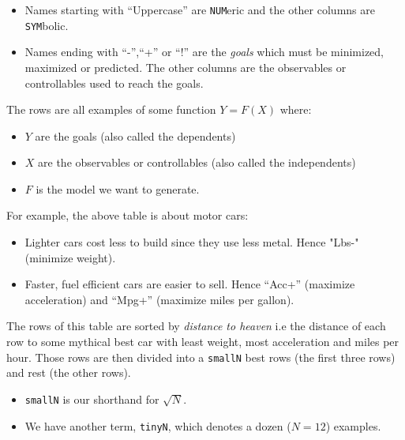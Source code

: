 \documentclass[landscape,	DIV=calc,%
							paper=letter,%
							fontsize=10pt,%
							twocolumn]{scrartcl}	 					%
\begin{document}
\begin{itemize}
    \item Names starting with ``Uppercase'' are \verb+NUM+eric and the other columns
        are \verb+SYM+bolic.  
    \item Names ending with ``-'',``+'' or ``!'' are the {\em goals}
which must  be minimized, maximized or predicted. The other columns
are the observables or controllables used to reach the goals.
\end{itemize}
The rows are all examples of some function $Y=F(X)$ where:

\begin{itemize}
    \item $Y$ are the goals (also called the dependents)
    \item $X$ are the observables or controllables (also called the independents)
    \item $F$ is the model we want to generate.
\end{itemize}
For example,  the above table is about motor cars:
\begin{itemize}
    \item
 Lighter cars cost less to build since they use less metal.
  Hence "Lbs-" (minimize weight).
\item Faster, fuel efficient cars  are easier to sell. Hence ``Acc+'' (maximize
   acceleration) and ``Mpg+'' (maximize miles per gallon).
\end{itemize}
The rows of this table are sorted by  {\em distance to heaven} i.e the
distance of each row to
some mythical best car with least weight, most acceleration and
miles per hour.  Those rows are then divided into a \verb+smallN+ best rows
(the first three rows) and rest (the other rows).

\begin{itemize}
    \item
 \verb+smallN+ is our shorthand for   $\sqrt{N}$.
\item We have another term,  \verb+tinyN+, which  denotes a dozen  ($N=12$) examples.  
\end{itemize}
\end{document}
